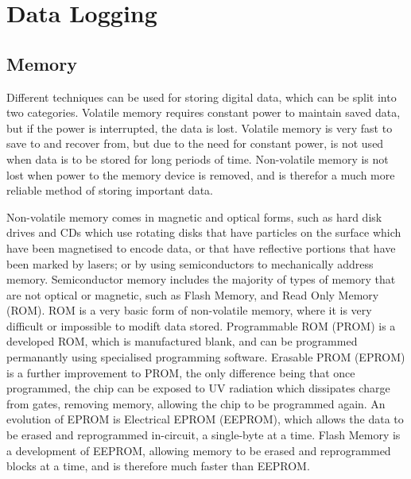 \section{Data Logging}

\subsection{Memory}
Different techniques can be used for storing digital data, which can be split into two categories. Volatile memory requires constant power to maintain saved data, but if the power is interrupted, the data is lost. Volatile memory is very fast to save to and recover from, but due to the need for constant power, is not used when data is to be stored for long periods of time. Non-volatile memory is not lost when power to the memory device is removed, and is therefor a much more reliable method of storing important data. 

Non-volatile memory comes in magnetic and optical forms, such as hard disk drives and CDs which use rotating disks that have particles on the surface which have been magnetised to encode data, or that have reflective portions that have been marked by lasers; or by using semiconductors to mechanically address memory. Semiconductor memory includes the majority of types of memory that are not optical or magnetic, such as Flash Memory, and Read Only Memory (ROM). ROM is a very basic form of non-volatile memory, where it is very difficult or impossible to modift data stored. Programmable ROM (PROM) is a developed ROM, which is manufactured blank, and can be programmed permanantly using specialised programming software. Erasable PROM (EPROM) is a further improvement to PROM, the only difference being that once programmed, the chip can be exposed to UV radiation which dissipates charge from gates, removing memory, allowing the chip to be programmed again. An evolution of EPROM is Electrical EPROM (EEPROM), which allows the data to be erased and reprogrammed in-circuit, a single-byte at a time. Flash Memory is a development of EEPROM, allowing memory to be erased and reprogrammed blocks at a time, and is therefore much faster than EEPROM.

